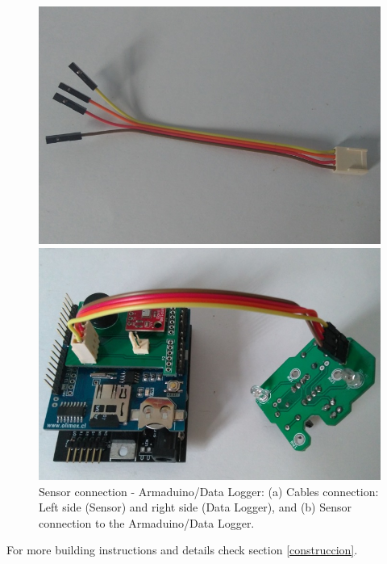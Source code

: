\documentclass[12pt,letterpaper]{article}
\numberwithin{figure}{section}
\numberwithin{equation}{section}
\numberwithin{table}{section}
\begin{document}
\begin{figure}[H]
    \centering
    \begin{minipage}{.45\textwidth}
    \centering
    \includegraphics[width=\linewidth]{Figuras/figure_23_a.jpg}
    \end{minipage}
    \centering
    \begin{minipage}{.45\textwidth}
    \centering
    \includegraphics[width=\linewidth]{Figuras/figure_23_b.jpg}
    \end{minipage}        
    \caption{Sensor connection - Armaduino/Data Logger: (a) Cables connection: Left side (Sensor) and right side (Data Logger), and (b) Sensor connection to the Armaduino/Data Logger.}
    \label{fig:23}
\end{figure}

For more building instructions and details check section \ref{construccion}.
\end{document}
